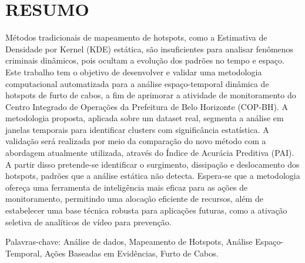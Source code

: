 \section{RESUMO}
\label{sec:resumo}
Métodos tradicionais de mapeamento de hotspots, como a Estimativa de Densidade por Kernel (KDE) estática, são insuficientes para analisar fenômenos criminais dinâmicos, pois ocultam a evolução dos padrões no tempo e espaço. Este trabalho tem o objetivo de desenvolver e validar uma metodologia computacional automatizada para a análise espaço-temporal dinâmica de hotspots de furto de cabos, a fim de aprimorar a atividade de monitoramento do Centro Integrado de Operações da Prefeitura de Belo Horizonte (COP-BH). A metodologia proposta, aplicada sobre um dataset real, segmenta a análise em janelas temporais para identificar clusters com significância estatística. A validação será realizada por meio da comparação do novo método com a abordagem atualmente utilizada, através do Índice de Acurácia Preditiva (PAI). A partir disso pretende-se identificar o surgimento, dissipação e deslocamento dos hotspots, padrões que a análise estática não detecta. Espera-se que a metodologia ofereça uma ferramenta de inteligência mais eficaz para as ações de monitoramento, permitindo uma alocação eficiente de recursos, além de estabelecer uma base técnica robusta para aplicações futuras, como a ativação seletiva de analíticos de vídeo para prevenção.

Palavras-chave: Análise de dados, Mapeamento de Hotspots, Análise Espaço-Temporal, Ações Baseadas em Evidências, Furto de Cabos.


